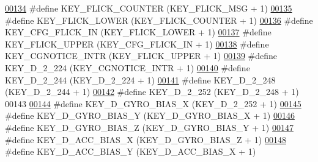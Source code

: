\begin{DoxyCode}
\hypertarget{dmp_key_8h_source.tex_l00134}{}\hyperlink{dmp_key_8h_a9819ea4a86d606453cffa54ce76aaab8}{00134} \textcolor{preprocessor}{#define KEY\_FLICK\_COUNTER           (KEY\_FLICK\_MSG + 1)}
\hypertarget{dmp_key_8h_source.tex_l00135}{}\hyperlink{dmp_key_8h_ad014d1d1e25860c08d35e8bdc10bba8c}{00135} \textcolor{preprocessor}{#define KEY\_FLICK\_LOWER             (KEY\_FLICK\_COUNTER + 1)}
\hypertarget{dmp_key_8h_source.tex_l00136}{}\hyperlink{dmp_key_8h_a0bf1aa125523ba79e89fd86f3827878a}{00136} \textcolor{preprocessor}{#define KEY\_CFG\_FLICK\_IN            (KEY\_FLICK\_LOWER + 1)}
\hypertarget{dmp_key_8h_source.tex_l00137}{}\hyperlink{dmp_key_8h_a0bec5499d24ecfdecb16902a481ff99f}{00137} \textcolor{preprocessor}{#define KEY\_FLICK\_UPPER             (KEY\_CFG\_FLICK\_IN + 1)}
\hypertarget{dmp_key_8h_source.tex_l00138}{}\hyperlink{dmp_key_8h_ae065cd2d13551072f4583ed8d8d1f2d2}{00138} \textcolor{preprocessor}{#define KEY\_CGNOTICE\_INTR           (KEY\_FLICK\_UPPER + 1)}
\hypertarget{dmp_key_8h_source.tex_l00139}{}\hyperlink{dmp_key_8h_a347a636f558e3dbe34416cd0bf1c2553}{00139} \textcolor{preprocessor}{#define KEY\_D\_2\_224                 (KEY\_CGNOTICE\_INTR + 1)}
\hypertarget{dmp_key_8h_source.tex_l00140}{}\hyperlink{dmp_key_8h_ae6367d55927a5d33025e26cdb2802156}{00140} \textcolor{preprocessor}{#define KEY\_D\_2\_244                 (KEY\_D\_2\_224 + 1)}
\hypertarget{dmp_key_8h_source.tex_l00141}{}\hyperlink{dmp_key_8h_a88cb8e3e64bc8a2fe2ff8eaab144ee9e}{00141} \textcolor{preprocessor}{#define KEY\_D\_2\_248                 (KEY\_D\_2\_244 + 1)}
\hypertarget{dmp_key_8h_source.tex_l00142}{}\hyperlink{dmp_key_8h_abb1983e9ff8a9ea79e3f25c25d7abd40}{00142} \textcolor{preprocessor}{#define KEY\_D\_2\_252                 (KEY\_D\_2\_248 + 1)}
00143 
\hypertarget{dmp_key_8h_source.tex_l00144}{}\hyperlink{dmp_key_8h_aef766eac70bd5f9b79063b218defdb75}{00144} \textcolor{preprocessor}{#define KEY\_D\_GYRO\_BIAS\_X               (KEY\_D\_2\_252 + 1)}
\hypertarget{dmp_key_8h_source.tex_l00145}{}\hyperlink{dmp_key_8h_a6b4c25f825b632321adbb3f6a2e4a24e}{00145} \textcolor{preprocessor}{#define KEY\_D\_GYRO\_BIAS\_Y               (KEY\_D\_GYRO\_BIAS\_X + 1)}
\hypertarget{dmp_key_8h_source.tex_l00146}{}\hyperlink{dmp_key_8h_aacbde5b7bf772a13472196e8a39cd4a3}{00146} \textcolor{preprocessor}{#define KEY\_D\_GYRO\_BIAS\_Z               (KEY\_D\_GYRO\_BIAS\_Y + 1)}
\hypertarget{dmp_key_8h_source.tex_l00147}{}\hyperlink{dmp_key_8h_ae9e554e3ebbcf665607d9be691bd67c3}{00147} \textcolor{preprocessor}{#define KEY\_D\_ACC\_BIAS\_X                (KEY\_D\_GYRO\_BIAS\_Z + 1)}
\hypertarget{dmp_key_8h_source.tex_l00148}{}\hyperlink{dmp_key_8h_a5428e476798576d70c877d9e681da541}{00148} \textcolor{preprocessor}{#define KEY\_D\_ACC\_BIAS\_Y                (KEY\_D\_ACC\_BIAS\_X + 1)}

\end{DoxyCode}
